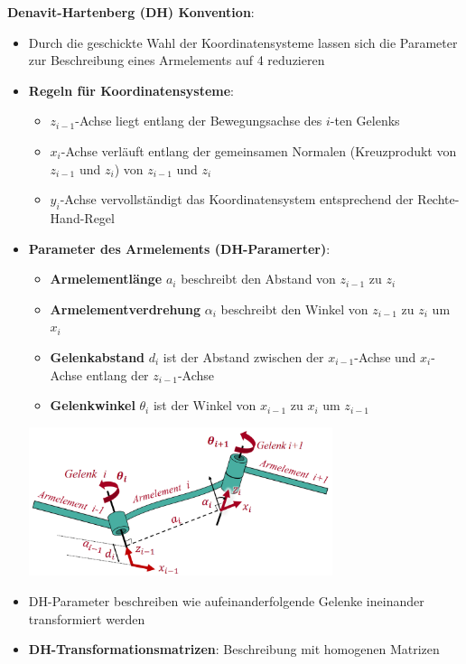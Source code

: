 \textbf{Denavit-Hartenberg (DH) Konvention}:
\begin{itemize}
	\item Durch die geschickte Wahl der Koordinatensysteme lassen sich die Parameter zur Beschreibung eines Armelements auf 4 reduzieren
	\item \textbf{Regeln für Koordinatensysteme}:
	\begin{itemize}
		\item $z_{i-1}$-Achse liegt entlang der Bewegungsachse des $i$-ten Gelenks
		\item $x_i$-Achse verläuft entlang der gemeinsamen Normalen (Kreuzprodukt von $z_{i-1}$ und $z_i$) von $z_{i-1}$ und $z_i$
		\item $y_i$-Achse vervollständigt das Koordinatensystem entsprechend der Rechte-Hand-Regel
	\end{itemize}
	\item \textbf{Parameter des Armelements (DH-Paramerter)}:
	\begin{itemize}
		\item \textbf{Armelementlänge} $a_i$ beschreibt den Abstand von $z_{i-1}$ zu $z_i$
		\item \textbf{Armelementverdrehung} $\alpha_i$ beschreibt den Winkel von $z_{i-1}$ zu $z_i$ um $x_i$
		\item \textbf{Gelenkabstand} $d_i$ ist der Abstand zwischen der $x_{i-1}$-Achse und $x_i$-Achse entlang der $z_{i-1}$-Achse
		\item \textbf{Gelenkwinkel} $\theta_i$ ist der Winkel von $x_{i-1}$ zu $x_i$ um $z_{i-1}$
	\end{itemize}
	\begin{center}
		\includegraphics[width=0.7\textwidth]{images/dh.png}
	\end{center}
	\item DH-Parameter beschreiben wie aufeinanderfolgende Gelenke ineinander transformiert werden
	\item \textbf{DH-Transformationsmatrizen}: Beschreibung mit homogenen Matrizen
	\begin{enumerate}

\end{enumerate}
\end{itemize}
